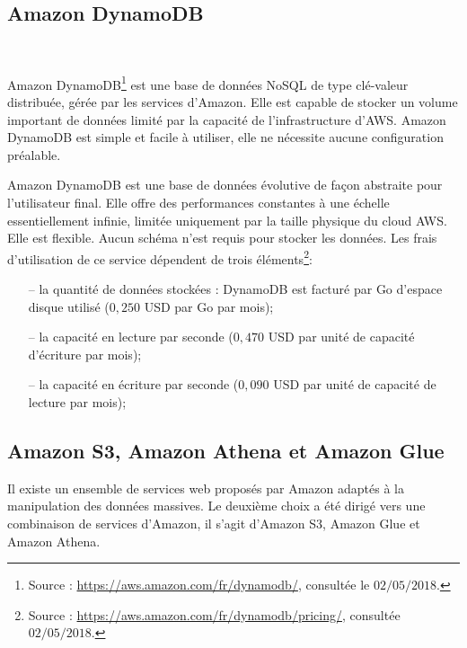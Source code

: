 	
	\subsection{Amazon DynamoDB}\label{aws:dynmo}~
	
	
	Amazon DynamoDB\footnote{Source : \url{https://aws.amazon.com/fr/dynamodb/}, consultée le $02/05/2018$.} est une base de données NoSQL de type clé-valeur distribuée, gérée par les services d'Amazon. Elle est capable de stocker un volume important de données limité par la capacité de l'infrastructure d'AWS. Amazon DynamoDB   est simple et facile à utiliser,  elle ne nécessite aucune configuration préalable. 
	
	Amazon DynamoDB  est une base de données évolutive de façon abstraite pour l'utilisateur final. Elle offre des performances constantes à une échelle essentiellement infinie, limitée uniquement par la taille physique du cloud AWS. Elle est flexible. Aucun schéma n'est requis pour stocker les données. Les frais d'utilisation de ce service dépendent de trois éléments\footnote{Source : \url{https://aws.amazon.com/fr/dynamodb/pricing/}, consultée $02/05/2018$.}:
	\begin{itemize}
		\item[--] la quantité de données stockées : DynamoDB est facturé par Go d'espace disque utilisé ($ 0,250 $ USD par Go par mois);
		\item[--] la capacité en lecture par seconde ($ 0,470 $ USD par unité de capacité d'écriture par mois);
		\item[--]  la capacité en écriture par seconde ($ 0,090 $ USD par unité de capacité de lecture par mois);
	\end{itemize}

\subsection{Amazon S3, Amazon Athena et Amazon Glue }

Il existe un ensemble de services web proposés par Amazon  adaptés à la manipulation des données massives. Le deuxième choix a été dirigé vers une combinaison de services d'Amazon, il s'agit d'Amazon S3, Amazon Glue et Amazon Athena.


